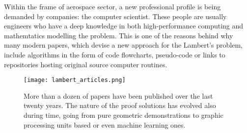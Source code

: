 Within the frame of aerospace sector, a new professional profile is being
demanded by companies: the computer scientist. These people are usually
engineers who have a deep knowledge in both high-performance computing and
mathemtatics modelling the problem. This is one of the reasons behind why many
modern papers, which devise a new approach for the Lambert's problem, include
algorithms in the form of code flowcharts, pseudo-code or links to repositories
hosting original source computer routines.

\begin{figure}[h]
  \centering
  \texttt{[image: lambert\_articles.png]}
  \caption[Publications related with Lamebert's problem.]{More than a dozen of papers have been published over the last twenty
    years. The nature of the proof solutions has evolved also during time, going
    from pure geometric demonstrations to graphic processing units based or even machine
    learning ones.}
  \label{fig:art_lambert}
\end{figure}

